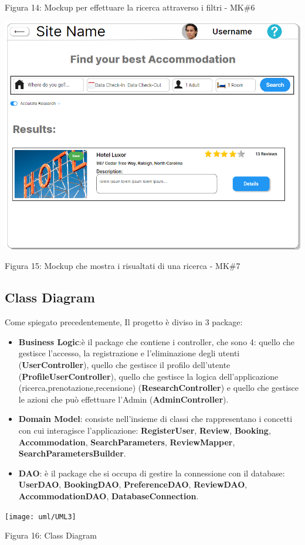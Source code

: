 \documentclass[10pt]{article}
\begin{document}
\begin{center}
\par\medskip
Figura 14: Mockup per effettuare la ricerca attraverso i filtri - MK\#6
\par\medskip
\includegraphics[scale=0.6]{Mockup/MockupResult}
\par\smallskip
Figura 15: Mockup che mostra i risualtati di una ricerca - MK\#7
\par\medskip
\end{center}

\subsection{Class Diagram}
Come spiegato precedentemente, Il progetto è diviso in 3 package:
\begin{itemize}
\item \textbf{Business Logic}:è il package che contiene i controller, che sono 4: quello che gestisce l'accesso, la registrazione e l'eliminazione degli utenti (\textbf{UserController}), quello che gestisce il profilo dell'utente (\textbf{ProfileUserController}), quello che gestisce la logica dell'applicazione (ricerca,prenotazione,recensione) (\textbf{ResearchController}) e quello che gestisce le azioni che può effettuare l'Admin (\textbf{AdminController}). 
\item \textbf{Domain Model}: consiste nell’insieme di classi che rappresentano i concetti con cui interagisce l’applicazione: \textbf{RegisterUser}, \textbf{Review}, \textbf{Booking}, \textbf{Accommodation}, \textbf{SearchParameters}, \textbf{ReviewMapper}, \textbf{SearchParametersBuilder}.
\item \textbf{DAO}: è il package che si occupa di gestire la connessione con il database: \textbf{UserDAO}, \textbf{BookingDAO}, \textbf{PreferenceDAO}, \textbf{ReviewDAO}, \textbf{AccommodationDAO}, \textbf{DatabaseConnection}.
\end{itemize}
\begin{center}
\texttt{[image: uml/UML3]}
\par\medskip
Figura 16: Class Diagram
\label{fig:uml}
\par\medskip
\end{center}
\end{document}
